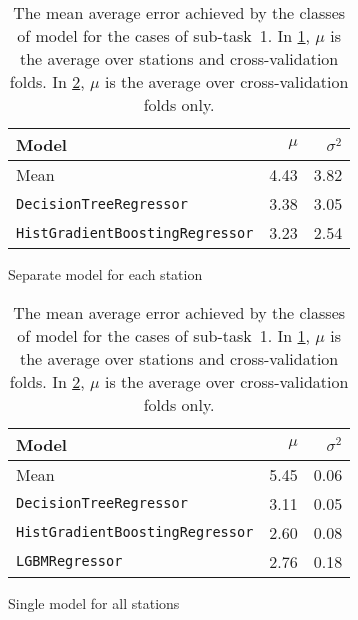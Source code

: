 \documentclass[11pt]{extarticle}
\begin{document}
\begin{table}
  \centering
  \begin{subfigure}{\textwidth}
    \centering
    \begin{tabular}{lrr}
      \toprule
      Model                                  & $\mu$ & $\sigma^2$
      \\
      \midrule
      Mean                                   & 4.43  & 3.82
      \\
      \texttt{DecisionTreeRegressor}         & 3.38  & 3.05
      \\
      \texttt{HistGradientBoostingRegressor} & 3.23  & 2.54
      \\
      \bottomrule
    \end{tabular}
    \caption{Separate model for each station}
    \label{tab:chart-subtask-1-1}
  \end{subfigure}
  \par\bigskip\bigskip
  \begin{subfigure}{\textwidth}
    \centering
    \begin{tabular}{lrr}
      \toprule
      Model                                  & $\mu$ & $\sigma^2$
      \\
      \midrule
      Mean                                   & 5.45  & 0.06
      \\
      \texttt{DecisionTreeRegressor}         & 3.11  & 0.05
      \\
      \texttt{HistGradientBoostingRegressor} & 2.60  & 0.08
      \\
      \texttt{LGBMRegressor}                 & 2.76  & 0.18
      \\
      \bottomrule
    \end{tabular}
    \caption{Single model for all stations}
    \label{tab:chart-subtask-1-2}
  \end{subfigure}
  \caption{The mean average error achieved by the classes of model for the cases of sub-task~1.
    In \cref{tab:chart-subtask-1-1}, $\mu$ is the average over stations and cross-validation folds.
    In \cref{tab:chart-subtask-1-2}, $\mu$ is the average over cross-validation folds only.
  }
  \label{tab:chart-subtask-1}
\end{table}

\printbibliography
\end{document}
